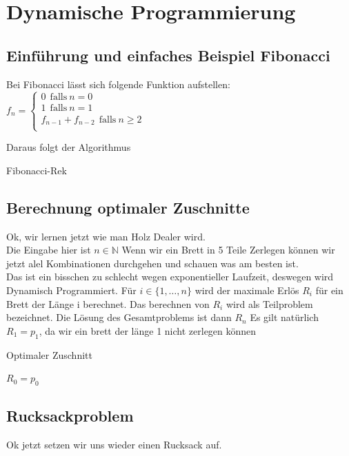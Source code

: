 \documentclass{report}
\begin{document}
\section{Dynamische Programmierung}
\subsection{Einführung und einfaches Beispiel Fibonacci}
Bei Fibonacci lässt sich folgende Funktion aufstellen: \\
$f_{n} = 
\begin{cases}
	0 \ \ \text{falls} \ n = 0 \\
	1 \ \ \text{falls} \ n = 1 \\
	f_{n-1} + f_{n-2} \ \ \text{falls} \ n \geq 2 \\
\end{cases}$

Daraus folgt der Algorithmus

\begin{algorithm}[H]
\caption{Fibonacci-Rek}

\end{algorithm}

\subsection{Berechnung optimaler Zuschnitte}
Ok, wir lernen jetzt wie man Holz Dealer wird.\\
Die Eingabe hier ist $ n \in \mathbb{N}  $ Wenn wir ein Brett in 5 Teile Zerlegen können wir jetzt alel Kombinationen durchgehen und schauen was am besten ist.\\
Das ist ein bisschen zu schlecht wegen exponentieller Laufzeit, deswegen wird Dynamisch Programmiert.
Für $ i \in \{1, \dots , n \}$ wird der maximale Erlös $R_{i}$ für ein Brett der Länge i berechnet.
Das berechnen von $R_{i}$ wird als Teilproblem bezeichnet.
Die Lösung des Gesamtproblems ist dann $R_{n}$
Es gilt natürlich $R_{1} = p_{1}$, da wir ein brett der länge 1 nicht zerlegen können\\

\begin{algorithm}[H]
\caption{Optimaler Zuschnitt}
$R_{0} = p_{0}$\\
\end{algorithm}
\subsection{Rucksackproblem}
Ok jetzt setzen wir uns wieder einen Rucksack auf. 
\end{document}
